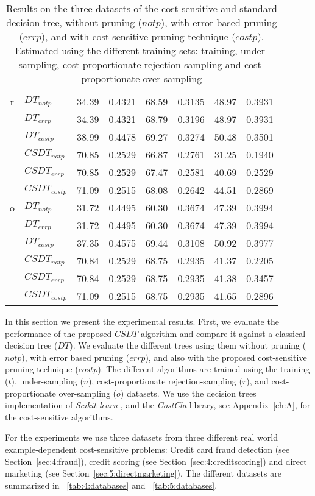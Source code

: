\begin{table}
\begin{tabular}{|c|l|c c|c c |c c|}
    \hline
    r&$DT_{not p}$& 34.39&0.4321&68.59&0.3135&48.97&0.3931\\
    &$DT_{err p}$&  34.39&0.4321&68.79&0.3196&48.97&0.3931\\
    &$DT_{cost p}$& 38.99&0.4478&69.27&0.3274&50.48&0.3501\\
    &$CSDT_{not p}$&  70.85&0.2529&66.87&0.2761&31.25&0.1940\\
    &$CSDT_{err p}$&  70.85&0.2529&67.47&0.2581&40.69&0.2529\\
    &$CSDT_{cost p}$& 71.09&0.2515&68.08&0.2642&44.51&0.2869\\
    \hline
    o&$DT_{not p}$& 31.72&0.4495&60.30&0.3674&47.39&0.3994\\
    &$DT_{err p}$&  31.72&0.4495&60.30&0.3674&47.39&0.3994\\
    &$DT_{cost p}$& 37.35&0.4575&69.44&0.3108&50.92&0.3977\\
    &$CSDT_{not p}$&  70.84&0.2529&68.75&0.2935&41.37&0.2205\\
    &$CSDT_{err p}$&  70.84&0.2529&68.75&0.2935&41.38&0.3457\\
    &$CSDT_{cost p}$& 71.09&0.2515&68.75&0.2935&41.65&0.2896\\
    \hline
  \end{tabular} 
    \caption{Results on the three datasets of the cost-sensitive and standard decision tree,    
  without pruning ($not p$), with error based pruning ($err p$), and with cost-sensitive pruning 
  technique ($cost p$). Estimated using the different training sets: training, under-sampling, 
  cost-proportionate rejection-sampling and cost-proportionate over-sampling}
  \label{tab:8:1}
\end{table}

In this section we present the experimental results. First, we evaluate the performance of the 
proposed $CSDT$ algorithm and compare it against a classical decision tree ($DT$). We evaluate 
the different trees using them without pruning ($not p$), with error based pruning ($err p$), 
and also with the proposed cost-sensitive pruning technique ($cost p$). The different algorithms 
are trained using the training ($t$), under-sampling ($u$), cost-proportionate rejection-sampling 
($r$), and cost-proportionate over-sampling ($o$) datasets. We use the decision trees 
implementation of \textit{Scikit-learn} \citep{Pedregosa2011}, and the \textit{CostCla} library, 
see Appendix~\ref{ch:A}, for the cost-sensitive algorithms.

For the experiments we use three datasets from three different real world example-dependent 
cost-sensitive problems: Credit card fraud detection (see Section~\ref{sec:4:fraud}), credit 
scoring (see Section~\ref{sec:4:creditscoring}) and direct marketing (see 
Section~\ref{sec:5:directmarketing}). The different datasets are summarized 
in \tablename{~\ref{tab:4:databases}} and \tablename{~\ref{tab:5:databases}}.

